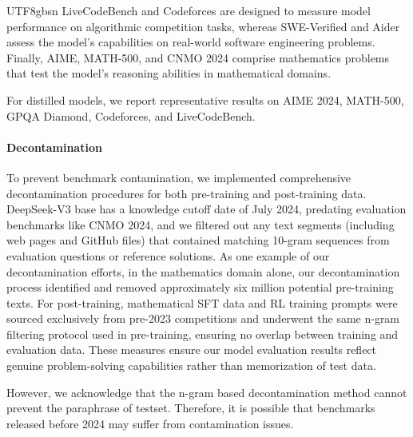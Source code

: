 \documentclass[11pt, a4paper, logo, copyright, nonumbering]{deepseek}
\begin{document}
\begin{CJK*}{UTF8}{gbsn}
LiveCodeBench and Codeforces are designed to measure model performance on algorithmic competition tasks, whereas SWE-Verified and Aider assess the model’s capabilities on real-world software engineering problems. Finally, AIME, MATH-500, and CNMO 2024 comprise mathematics problems that test the model’s reasoning abilities in mathematical domains.

For distilled models, we report representative results on AIME 2024, MATH-500, GPQA Diamond, Codeforces, and LiveCodeBench.

\paragraph{Decontamination}\label{sec:conta}
To prevent benchmark contamination, we implemented comprehensive decontamination procedures for both pre-training and post-training data. DeepSeek-V3 base has a knowledge cutoff date of July 2024, predating evaluation benchmarks like CNMO 2024, and we filtered out any text segments (including web pages and GitHub files) that contained matching 10-gram sequences from evaluation questions or reference solutions. As one example of our decontamination efforts, in the mathematics domain alone, our decontamination process identified and removed approximately six million potential pre-training texts. For post-training, mathematical SFT data and RL training prompts were sourced exclusively from pre-2023 competitions and underwent the same n-gram filtering protocol used in pre-training, ensuring no overlap between training and evaluation data. These measures ensure our model evaluation results reflect genuine problem-solving capabilities rather than memorization of test data.

However, we acknowledge that  the n-gram based decontamination method cannot prevent the paraphrase of testset. Therefore, it is possible that benchmarks released before 2024 may suffer from contamination issues. 


\end{CJK*}
\end{document}
